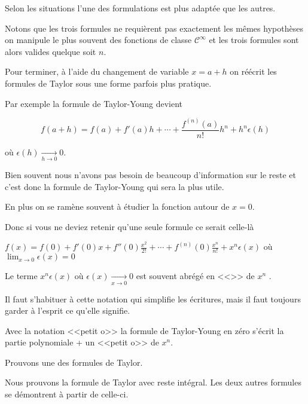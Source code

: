 \change

\change



Selon les situations l'une des formulations est plus adaptée que les autres.


Notons que les trois formules ne requièrent pas exactement les mêmes hypothèses
 on manipule le plus souvent des fonctions de classe $\mathcal{C}^\infty$
et les trois formules sont alors valides quelque soit $n$.

\change

Pour terminer, à l'aide du changement de variable $x=a+h$ 
on réécrit les formules de Taylor sous une forme parfois plus pratique.

Par exemple la formule de Taylor-Young devient 

$$f(a+h)=f(a)+f'(a)h+\cdots
+\frac{f^{(n)}(a)}{n!}h^n+h^n \epsilon(h)$$

où $\epsilon(h) \xrightarrow[h\to 0]{} 0$.


\diapo

Bien souvent nous n'avons pas besoin de beaucoup d'information sur le reste et 
c'est donc la formule de Taylor-Young qui sera la plus utile.

En plus on se ramène souvent à étudier la fonction autour de $x=0$.

Donc si vous ne deviez retenir qu'une seule formule ce serait celle-là 

$f(x)= f(0)+f'(0)x+f''(0)\frac{x^2}{2!}+\cdots
+f^{(n)}(0)\frac{x^n}{n!} + x^n\epsilon(x)$
où \ $\lim_{x\to0}\epsilon (x)=0$


\change

Le terme $x^n\epsilon(x)$ où $\epsilon(x) \xrightarrow[x\to 0]{} 0$
est souvent abrégé en <<>> de $x^n$ .

Il faut s'habituer à cette notation qui simplifie les écritures, 
mais il faut toujours garder à l'esprit ce qu'elle signifie.


\change

Avec la notation <<petit o>> 
la formule de Taylor-Young en zéro s'écrit
la partie polynomiale + un <<petit o>> de $x^n$.


\diapo

Prouvons une des formules de Taylor.

\change

Nous prouvons la formule de Taylor avec reste intégral.
Les deux autres formules se démontrent à partir de celle-ci.

